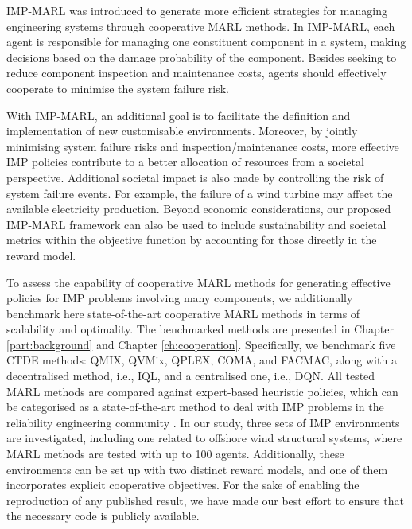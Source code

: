 IMP-MARL was introduced to generate more efficient strategies for managing engineering systems through cooperative MARL methods.
In IMP-MARL, each agent is responsible for managing one constituent component in a system, making decisions based on the damage probability of the component.
Besides seeking to reduce component inspection and maintenance costs, agents should effectively cooperate to minimise the system failure risk.

With IMP-MARL, an additional goal is to facilitate the definition and implementation of new customisable environments.
Moreover, by jointly minimising system failure risks and inspection/maintenance costs, more effective IMP policies contribute to a better allocation of resources from a societal perspective.
Additional societal impact is also made by controlling the risk of system failure events.
For example, the failure of a wind turbine may affect the available electricity production. 
Beyond economic considerations, our proposed IMP-MARL framework can also be used to include sustainability and societal metrics within the objective function by accounting for those directly in the reward model.

To assess the capability of cooperative MARL methods for generating effective policies for IMP problems involving many components, we additionally benchmark here state-of-the-art cooperative MARL methods in terms of scalability and optimality.
The benchmarked methods are presented in Chapter \ref{part:background} and Chapter \ref{ch:cooperation}.
Specifically, we benchmark five CTDE methods: QMIX, QVMix, QPLEX, COMA, and FACMAC, along with a decentralised method, i.e., IQL, and a centralised one, i.e., DQN.
All tested MARL methods are compared against expert-based heuristic policies, which can be categorised as a state-of-the-art method to deal with IMP problems in the reliability engineering community \citep{LuqueDBN2019, morato2022optimal}.
In our study, three sets of IMP environments are investigated, including one related to offshore wind structural systems, where MARL methods are tested with up to 100 agents.
Additionally, these environments can be set up with two distinct reward models, and one of them incorporates explicit cooperative objectives.
For the sake of enabling the reproduction of any published result, we have made our best effort to ensure that the necessary code is publicly available.

